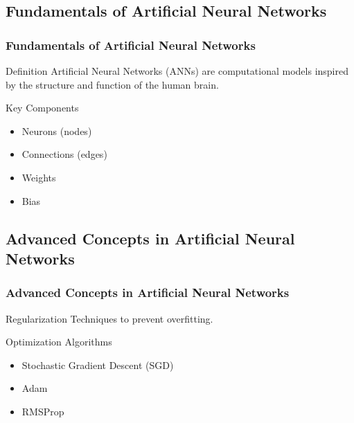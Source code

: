 \documentclass[aspectratio=169, hideothersubsections]{beamer}
\begin{document}
\subsection{Fundamentals of Artificial Neural Networks}
\begin{frame}
    \frametitle{Fundamentals of Artificial Neural Networks}
    \begin{block}{Definition}
        Artificial Neural Networks (ANNs) are computational models inspired by the structure and function of the human brain.
    \end{block}
    \begin{block}{Key Components}
        \begin{itemize}
            \item Neurons (nodes)
            \item Connections (edges)
            \item Weights
            \item Bias
        \end{itemize}
    \end{block}
\end{frame}

\subsection{Advanced Concepts in Artificial Neural Networks}
\begin{frame}
    \frametitle{Advanced Concepts in Artificial Neural Networks}
    \begin{block}{Regularization}
        Techniques to prevent overfitting.
    \end{block}
    \begin{block}{Optimization Algorithms}
        \begin{itemize}
            \item Stochastic Gradient Descent (SGD)
            \item Adam
            \item RMSProp
        \end{itemize}
    \end{block}
\end{frame}
\end{document}

